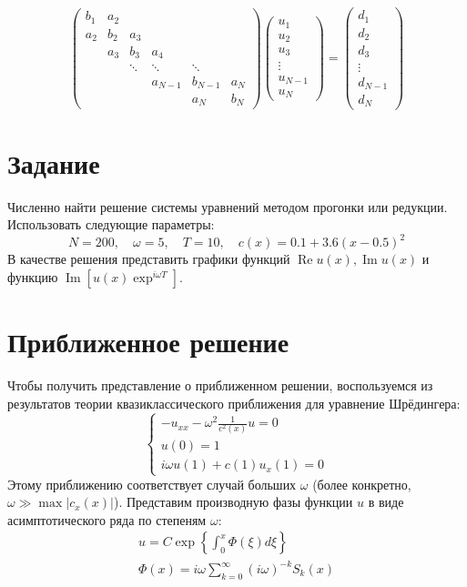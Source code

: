 \documentclass[12pt]{article}
\begin{document}
\[
\begin{pmatrix}
b_1 & a_2 \\
a_2 & b_2 & a_3 \\
& a_3 & b_3 & a_4 \\
&& \ddots & \ddots & \ddots\\
&&& a_{N-1} & b_{N-1} & a_N\\
&&&& a_N & b_N
\end{pmatrix}
\begin{pmatrix}
u_1\\u_2\\u_3\\\vdots\\u_{N-1}\\u_N
\end{pmatrix} = 
\begin{pmatrix}
d_1\\d_2\\d_3\\\vdots\\d_{N-1}\\d_N
\end{pmatrix}
\]

\section{Задание}

Численно найти решение системы уравнений методом прогонки или редукции.
Использовать следующие параметры: 
\[N = 200,\quad \omega = 5,\quad T = 10,\quad c(x) = 0.1 + 3.6 (x - 0.5)^2\]
В качестве решения представить графики функций $\operatorname{Re} u(x), \operatorname{Im}
u(x)$ и функцию $\operatorname{Im}\left[u(x) \exp^{i\omega T}\right]$.

\section{Приближенное решение}

Чтобы получить представление о приближенном решении, воспользуемся из
результатов теории квазиклассического приближения для уравнение Шрёдингера:
\[
\begin{cases}
-u_{xx} - \omega^2 \frac{1}{c^2(x)} u = 0\\
u(0) = 1\\
i \omega u(1) + c(1) u_x(1) = 0
\end{cases}
\]
Этому приближению соответствует случай больших $\omega$ (более конкретно,
$\omega \gg \max |c_x(x)|$). Представим производную фазы функции $u$ в виде асимптотического
ряда по степеням $\omega$:
\begin{gather*}
u = C \exp \left\{ \int_0^x \Phi(\xi) d\xi \right\}\\
\Phi(x) = i\omega \sum_{k=0}^\infty (i\omega)^{-k}S_k(x)
\end{gather*}
\end{document}
